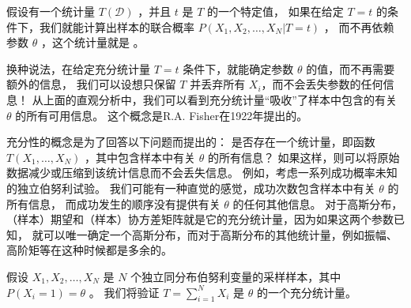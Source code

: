 \documentclass[letterpaper,10pt,english]{sphinxmanual}
\begin{document}

假设有一个统计量 \(T(\mathcal{D})\) ，并且 \(t\) 是 \(T\) 的一个特定值，
如果在给定 \(T=t\) 的条件下，我们就能计算出样本的联合概率 \(P(X_1,X_2,\dots,X_N|T=t)\) ，
而不再依赖参数 \(\theta\) ，这个统计量就是  。

换种说法，在给定充分统计量 \(T=t\) 条件下，就能确定参数 \(\theta\) 的值，而不再需要额外的信息，
我们可以设想只保留 \(T\) 并丢弃所有 \(X_i\)，而不会丢失参数的任何信息！
从上面的直观分析中，我们可以看到充分统计量“吸收”了样本中包含的有关 \(\theta\) 的所有可用信息。
这个概念是R.A. Fisher在1922年提出的。

充分性的概念是为了回答以下问题而提出的：
是否存在一个统计量，即函数 \(T(X_1,\dots,X_N)\) ，其中包含样本中有关 \(\theta\) 的所有信息？
如果这样，则可以将原始数据减少或压缩到该统计信息而不会丢失信息。
例如，考虑一系列成功概率未知的独立伯努利试验。
我们可能有一种直觉的感觉，成功次数包含样本中有关 \(\theta\) 的所有信息，
而成功发生的顺序没有提供有关 \(\theta\) 的任何其他信息。
对于高斯分布，（样本）期望和（样本）协方差矩阵就是它的充分统计量，因为如果这两个参数已知，
就可以唯一确定一个高斯分布，而对于高斯分布的其他统计量，例如振幅、高阶矩等在这种时候都是多余的。

\begin{sphinxShadowBox}

假设 \(X_1,X_2,\dots,X_N\) 是 \(N\) 个独立同分布伯努利变量的采样样本，其中 \(P(X_i=1)=\theta\) 。
我们将验证 \(T=\sum_{i=1}^N X_i\) 是 \(\theta\) 的一个充分统计量。
\end{sphinxShadowBox}
\end{document}
